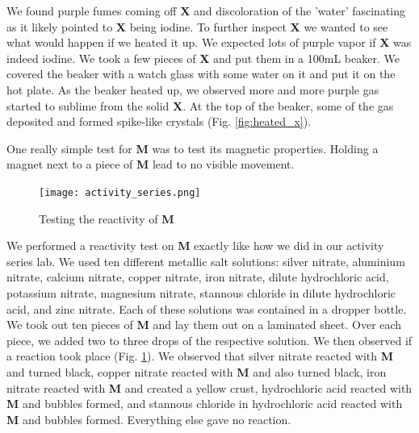 \documentclass[titlepage]{article}
\begin{document}
We found purple fumes coming off \textbf{X} and discoloration of the 'water' fascinating as it likely pointed to \textbf{X} being iodine. To further inspect \textbf{X} we wanted to see what would happen if we heated it up. We expected lots of purple vapor if \textbf{X} was indeed iodine. We took a few pieces of \textbf{X} and put them in a 100\unit{\milli\liter} beaker. We covered the beaker with a watch glass with some water on it and put it on the hot plate. As the beaker heated up, we observed more and more purple gas started to sublime from the solid \textbf{X}. At the top of the beaker, some of the gas deposited and formed spike-like crystals (Fig. \ref{fig:heated_x}).

\bigskip
One really simple test for \textbf{M} was to test its magnetic properties. Holding a magnet next to a piece of \textbf{M} lead to no visible movement.

\begin{figure}[h]
    \centering
    \texttt{[image: activity\_series.png]} 
    \caption{Testing the reactivity of \textbf{M}}
    \label{fig:act_series}
\end{figure}

We performed a reactivity test on \textbf{M} exactly like how we did in our activity series lab. We used ten different metallic salt solutions: silver nitrate, aluminium nitrate, calcium nitrate, copper nitrate, iron nitrate, dilute hydrochloric acid, potassium nitrate, magnesium nitrate, stannous chloride in dilute hydrochloric acid, and zinc nitrate. Each of these solutions was contained in a dropper bottle. We took out ten pieces of \textbf{M} and lay them out on a laminated sheet. Over each piece, we added two to three drops of the respective solution. We then observed if a reaction took place (Fig. \ref{fig:act_series}). We observed that silver nitrate reacted with \textbf{M} and turned black, copper nitrate reacted with \textbf{M} and also turned black, iron nitrate reacted with \textbf{M} and created a yellow crust, hydrochloric acid reacted with \textbf{M} and bubbles formed, and stannous chloride in hydrochloric acid reacted with \textbf{M} and bubbles formed. Everything else gave no reaction.

%
\end{document}
